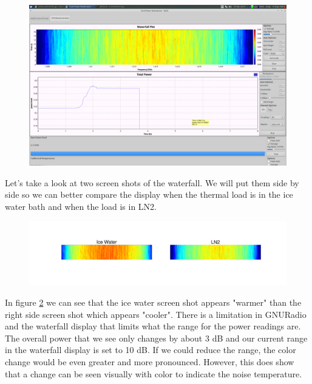 \begin{figure}[h!tb] \centering

\includegraphics[width=\textwidth]{Experiments/Exp1/LN2_waterfall.png}

\label{LN2_waterfall}
\end{figure}

Let's take a look at two screen shots of the waterfall.  We will put them side by side so we can better compare the display when the thermal load is in the ice water bath and when the load is in LN2.

\begin{figure}[h!tb] \centering

\includegraphics[width=\textwidth]{Experiments/Exp1/waterfall_side.pdf}

\label{side_waterfall}
\end{figure}

In figure \ref{side_waterfall} we can see that the ice water screen shot appears "warmer" than the right side screen shot which appears "cooler".  There is a limitation in GNURadio and the waterfall display that limits what the range for the power readings are.  The overall power that we see only changes by about 3 dB and our current range in the waterfall display is set to 10 dB.  If we could reduce the range, the color change would be even greater and more pronounced.  However, this does show that a change can be seen visually with color to indicate the noise temperature.  

